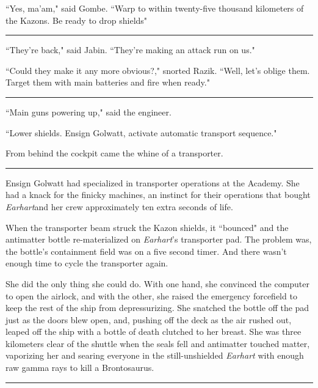 \documentclass[twoside,letterpaper,12pt]{memoir}
\begin{document}
``Yes, ma'am," said Gombe. ``Warp to within twenty-five thousand kilometers of the Kazons. Be ready to drop shields"

\begin{center}\rule{3cm}{0.4 pt}\end{center}

``They're back," said Jabin. ``They're making an attack run on us."

“Could they make it any more obvious?," snorted Razik. ``Well, let's oblige them. Target them with main batteries and fire when ready."

\begin{center}\rule{3cm}{0.4 pt}\end{center}

``Main guns powering up," said the engineer.

``Lower shields. Ensign Golwatt, activate automatic transport sequence."

From behind the cockpit came the whine of a transporter.

\begin{center}\rule{3cm}{0.4 pt}\end{center}

Ensign Golwatt had specialized in transporter operations at the Academy. She had a knack for the finicky machines, an instinct for their operations that bought \textit{Earhart}and her crew approximately ten extra seconds of life.

When the transporter beam struck the Kazon shields, it ``bounced" and the antimatter bottle re-materialized on \textit{Earhart}'s transporter pad. The problem was, the bottle's containment field was on a five second timer. And there wasn't enough time to cycle the transporter again.

She did the only thing she could do. With one hand, she convinced the computer to open the airlock, and with the other, she raised the emergency forcefield to keep the rest of the ship from depressurizing. She snatched the bottle off the pad just as the doors blew open, and, pushing off the deck as the air rushed out, leaped off the ship with a bottle of death clutched to her breast. She was three kilometers clear of the shuttle when the seals fell and antimatter touched matter, vaporizing her and searing everyone in the still-unshielded \textit{Earhart} with enough raw gamma rays to kill a Brontosaurus.

\begin{center}\rule{3cm}{0.4 pt}\end{center}
\end{document}
